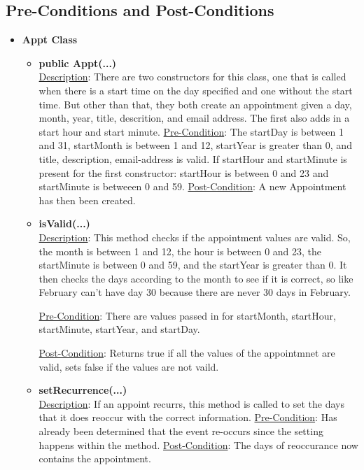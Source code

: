 \documentclass[12pt]{article}
\begin{document}
\subsection{Pre-Conditions and Post-Conditions}
\begin{itemize} 

\item \textbf {Appt Class}
	\begin{itemize}
	\item \textbf {public Appt(...)} \\
	\underline{Description}: There are two constructors for this class, one that is called when there is a start time on the day specified and one without the start time. But other than that, they both create an appointment given a day, month, year, title, descrition, and email address. The first also adds in a start hour and start minute. \newline
	\underline{Pre-Condition}: The startDay is between 1 and 31, startMonth is between 1 and 12, startYear is greater than 0, and title, description, email-address is valid. If startHour and startMinute is present for the first constructor: startHour is between 0 and 23 and startMinute is betweeen 0 and 59. \newline 
	\underline{Post-Condition}: A new Appointment has then been created. 

	\item \textbf {isValid(...)} \\
	\underline{Description}: This method checks if the appointment values are valid. So, the month is between 1 and 12, the hour is between 0 and 23, the startMinute is between 0 and 59, and the startYear is greater than 0. It then checks the days according to the month to see if it is correct, so like February can't have day 30 because there are never 30 days in February. \par
	\underline{Pre-Condition}: There are values passed in for startMonth, startHour, startMinute, startYear, and startDay. \par 
	\underline{Post-Condition}: Returns true if all the values of the appointmnet are valid, sets false if the values are not vaild. 

	\item \textbf {setRecurrence(...)} \\
	\underline{Description}: If an appoint recurrs, this method is called to set the days that it does reoccur with the correct information. \newline
	\underline{Pre-Condition}: Has already been determined that the event re-occurs since the setting happens within the method. \newline 
	\underline{Post-Condition}: The days of reoccurance now contains the appointment. 


\end{itemize}
\end{itemize}
\end{document}
